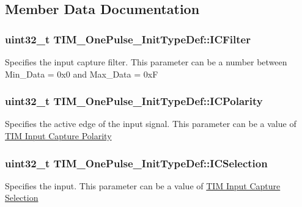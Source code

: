 \subsection{Member Data Documentation}
\subsubsection[{\texorpdfstring{I\+C\+Filter}{ICFilter}}]{\setlength{\rightskip}{0pt plus 5cm}uint32\+\_\+t T\+I\+M\+\_\+\+One\+Pulse\+\_\+\+Init\+Type\+Def\+::\+I\+C\+Filter}\hypertarget{struct_t_i_m___one_pulse___init_type_def_a883e69dec14d8bde9914906be1b04ad7}{}\label{struct_t_i_m___one_pulse___init_type_def_a883e69dec14d8bde9914906be1b04ad7}
Specifies the input capture filter. This parameter can be a number between Min\+\_\+\+Data = 0x0 and Max\+\_\+\+Data = 0xF 
\subsubsection[{\texorpdfstring{I\+C\+Polarity}{ICPolarity}}]{\setlength{\rightskip}{0pt plus 5cm}uint32\+\_\+t T\+I\+M\+\_\+\+One\+Pulse\+\_\+\+Init\+Type\+Def\+::\+I\+C\+Polarity}\hypertarget{struct_t_i_m___one_pulse___init_type_def_a8589cf95218ea62604b845054b36b772}{}\label{struct_t_i_m___one_pulse___init_type_def_a8589cf95218ea62604b845054b36b772}
Specifies the active edge of the input signal. This parameter can be a value of \hyperlink{group___t_i_m___input___capture___polarity}{T\+IM Input Capture Polarity} 
\subsubsection[{\texorpdfstring{I\+C\+Selection}{ICSelection}}]{\setlength{\rightskip}{0pt plus 5cm}uint32\+\_\+t T\+I\+M\+\_\+\+One\+Pulse\+\_\+\+Init\+Type\+Def\+::\+I\+C\+Selection}\hypertarget{struct_t_i_m___one_pulse___init_type_def_a9e8853f17e85393a869aa2ecb315f030}{}\label{struct_t_i_m___one_pulse___init_type_def_a9e8853f17e85393a869aa2ecb315f030}
Specifies the input. This parameter can be a value of \hyperlink{group___t_i_m___input___capture___selection}{T\+IM Input Capture Selection} 
